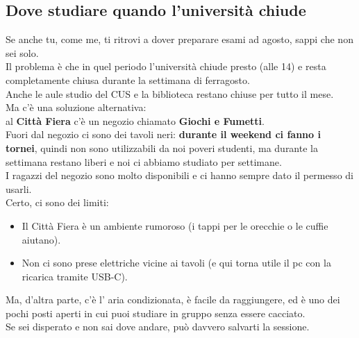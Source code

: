 \documentclass[18pt]{extarticle}
\begin{document}
\subsection{Dove studiare quando l'università chiude}
Se anche tu, come me, ti ritrovi a dover preparare esami ad agosto, sappi che non sei solo.\\
Il problema è che in quel periodo l'università chiude presto (alle 14) e resta completamente chiusa durante la settimana di ferragosto.\\
Anche le aule studio del CUS e la biblioteca restano chiuse per tutto il mese.\\
Ma c'è una soluzione alternativa:\\
al \textbf{Città Fiera} c'è un negozio chiamato \textbf{Giochi e Fumetti}.\\
Fuori dal negozio ci sono dei tavoli neri: \textbf{durante il weekend ci fanno i tornei}, quindi non sono utilizzabili da noi poveri studenti, ma durante la settimana restano liberi e noi ci abbiamo studiato per settimane.\\
I ragazzi del negozio sono molto disponibili e ci hanno sempre dato il permesso di usarli.\\
Certo, ci sono dei limiti:
\begin{itemize}
\item Il Città Fiera è un ambiente rumoroso (i tappi per le orecchie o le cuffie aiutano).
\item Non ci sono prese elettriche vicine ai tavoli (e qui torna utile il pc con la ricarica tramite USB-C).
\end{itemize}
Ma, d'altra parte, c'è l' aria condizionata, è facile da raggiungere, ed è uno dei pochi posti aperti in cui puoi studiare in gruppo senza essere cacciato.\\
Se sei disperato e non sai dove andare, può davvero salvarti la sessione.

\clearpage
\end{document}
